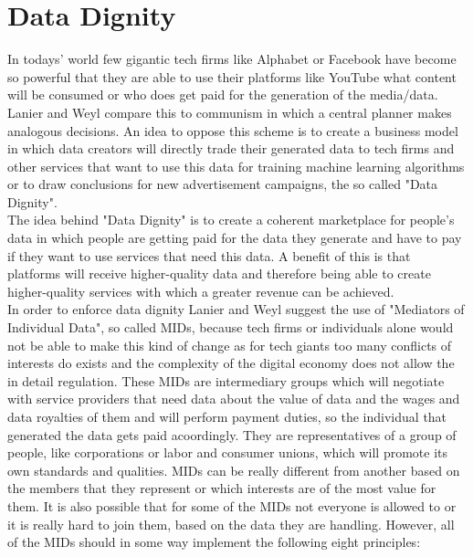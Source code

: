 \documentclass[a4paper,12pt]{report}
\begin{document}
	\section[Data Dignity]{Data Dignity \cite{LanierWeylBlueprint}}
	\startsection
		In todays' world few gigantic tech firms like Alphabet or Facebook have become so powerful that they are able to use their platforms like YouTube what content will be consumed or who does get paid for the generation of the media/data. Lanier and Weyl compare this to communism in which a central planner makes analogous decisions. An idea to oppose this scheme is to create a business model in which data creators will directly trade their generated data to tech firms and other services that want to use this data for training machine learning algorithms or to draw conclusions for new advertisement campaigns, the so called "Data Dignity". \\
		The idea behind "Data Dignity" is to create a coherent marketplace for people's data in which people are getting paid for the data they generate and have to pay if they want to use services that need this data. A benefit of this is that platforms will receive higher-quality data and therefore being able to create higher-quality services with which a greater revenue can be achieved. \\
		In order to enforce data dignity Lanier and Weyl suggest the use of "Mediators of Individual Data", so called MIDs, because tech firms or individuals alone would not be able to make this kind of change as for tech giants too many conflicts of interests do exists and the complexity of the digital economy does not allow the in detail regulation. These MIDs are intermediary groups which will negotiate with service providers that need data about the value of data and the wages and data royalties of them and will perform payment duties, so the individual that generated the data gets paid acoordingly. They are representatives of a group of people, like corporations or labor and consumer unions, which will promote its own standards and qualities. MIDs can be really different from another based on the members that they represent or which interests are of the most value for them. It is also possible that for some of the MIDs not everyone is allowed to or it is really hard to join them, based on the data they are handling. However, all of the MIDs should in some way implement the following eight principles:
\end{document}

